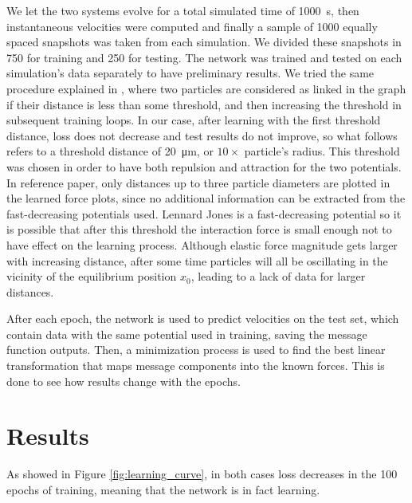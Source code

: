 \documentclass[../../master_thesis_np.tex]{subfiles}
\begin{document}
We let the two systems evolve for a total simulated time of \SI{1000}{\second}, then instantaneous velocities were computed and finally a sample of \num{1000} equally spaced snapshots was taken from each simulation.
We divided these snapshots in \num{750} for training and \num{250} for testing.
The network was trained and tested on each simulation's data separately to have preliminary results.
We tried the same procedure explained in \cite{ruiz-garcia_discovering_2024}, where two particles are considered as linked in the graph if their distance is less than some threshold, and then increasing the threshold in subsequent training loops.
In our case, after learning with the first threshold distance, loss does not decrease and test results do not improve, so what follows refers to a threshold distance of \SI{20}{\um}, or $10 \times$ particle's radius.
This threshold was chosen in order to have both repulsion and attraction for the two potentials.
In reference paper, only distances up to three particle diameters are plotted in the learned force plots, since no additional information can be extracted from the fast-decreasing potentials \citeauthor{ruiz-garcia_discovering_2024} used.
Lennard Jones is a fast-decreasing potential so it is possible that after this threshold the interaction force is small enough not to have effect on the learning process.
Although elastic force magnitude gets larger with increasing distance, after some time particles will all be oscillating in the vicinity of the equilibrium position $x_0$, leading to a lack of data for larger distances.

After each epoch, the network is used to predict velocities on the test set, which contain data with the same potential used in training, saving the message function outputs.
Then, a minimization process is used to find the best linear transformation that maps message components into the known forces.
This is done to see how results change with the epochs.

\section{Results} \label{4results}
As showed in Figure \ref{fig:learning_curve}, in both cases loss decreases in the 100 epochs of training, meaning that the network is in fact learning.
\end{document}
